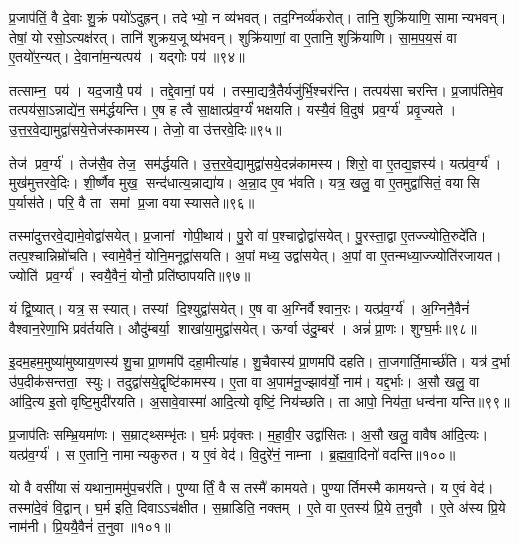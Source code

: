प्र॒जाप॑तिं॒ वै दे॒वाः  शु॒क्रं पयो॑ऽदुह्रन्। तदेभ्यो॒ न व्य॑भवत्। तद॒ग्निर्व्य॑करोत्। तानि॒ शुक्रि॑याणि॒ सामान्यभवन्। तेषां॒ यो रसो॒ऽत्यक्ष॑रत्। तानि॑ शुक्रय॒जूष्य॑भवन्। शुक्रि॑याणां॒ वा ए॒तानि॒ शुक्रि॑याणि। सा॒म॒प॒य॒सं वा ए॒तयो॑र॒न्यत्। दे॒वाना॑म॒न्यत्पय॑। यद्गोः पय॑॥९४॥

तत्साम्न॒ पय॑। यद॒जायै॒ पय॑। तद्दे॒वानां॒ पय॑। तस्मा॒द्यत्रै॒तैर्यजु॑र्भि॒\-श्चर॑न्ति। तत्पय॑सा चरन्ति। प्र॒जाप॑तिमे॒व तत्पय॑सा॒ऽन्नाद्ये॑न॒ सम॑र्द्धयन्ति। ए॒ष ह त्वै सा॒क्षात्प्र॑व॒र्ग्यं॑ भक्षयति। यस्यै॒वं  वि॒दुष॑ प्रव॒र्ग्य॑ प्रवृ॒ज्यते। उ॒त्त॒र॒वे॒द्यामुद्वा॑स\-ये॒त्तेज॑स्कामस्य। तेजो॒ वा उ॑त्तरवे॒दिः॥९५॥

तेज॑ प्रव॒र्ग्य॑। तेज॑सै॒व तेज॒ सम॑र्द्धयति। उ॒त्त॒र॒वे॒द्यामुद्वा॑सये॒\-दन्न॑\-कामस्य। शिरो॒ वा ए॒तद्य॒ज्ञस्य॑। यत्प्र॑व॒र्ग्य॑। मुख॑मुत्तरवे॒दिः। शी॒र्ष्णैव मुख॒ सन्द॑धात्य॒न्नाद्या॑य। अ॒न्ना॒द ए॒व भ॑वति। यत्र॒ खलु॒ वा ए॒तमुद्वा॑सितं॒ वयासि प॒र्यास॑ते। परि॒ वै ता समां प्र॒जा वयास्यासते॥९६॥

तस्मा॑दुत्तरवे॒द्यामे॒वोद्वा॑सयेत्। प्र॒जानां गोपी॒थाय॑। पु॒रो वा॑ प॒श्चाद्वोद्वा॑सयेत्। पु॒रस्ता॒द्वा ए॒तज्ज्योति॒रुदे॑ति। तत्प॒श्चान्निम्रो॑चति। स्वामे॒वैनं॒ योनि॒मनूद्वा॑सयति। अ॒पां मध्य॒ उद्वा॑सयेत्। अ॒पां वा ए॒तन्मध्या॒ज्ज्योति॑रजायत। ज्योति॑ प्रव॒र्ग्य॑। स्वयै॒वैनं॒ योनौ॒ प्रति॑ष्ठापयति॥९७॥

यं द्वि॒ष्यात्। यत्र॒ स स्यात्। तस्यां दि॒श्युद्वा॑सयेत्। ए॒ष वा अ॒ग्निर्वैश्वान॒रः। यत्प्र॑व॒र्ग्य॑। अ॒ग्निनै॒वैनं॑ वैश्वान॒रेणा॒भि प्रव॑र्तयति। औदु॑म्बर्या॒ शाखा॑या॒मुद्वा॑सयेत्। ऊर्ग्वा उ॑दु॒म्बर॑। अन्नं॑ प्रा॒णः। शुग्घ॒र्मः॥९८॥

इ॒दम॒हम॒मुष्या॑मुष्याय॒णस्य॑ शु॒चा प्रा॒णमपि॑ दहा॒मीत्या॑ह। शु॒चैवास्य॑ प्रा॒णमपि॑ दहति। ता॒जगार्ति॒मार्च्छ॑ति। यत्र॑ द॒र्भा उ॑प॒दीक॑सन्तता॒ स्युः। तदुद्वा॑सये॒द्वृष्टि॑कामस्य। ए॒ता वा अ॒पाम॑नू॒ज्झाव॑र्यो॒ नाम॑। यद्द॒र्भाः। अ॒सौ खलु॒ वा आ॑दि॒त्य इ॒तो वृष्टि॒मुदी॑रयति। अ॒सावे॒वास्मा॑ आदि॒त्यो वृष्टिं॒ निय॑च्छति। ता आपो॒ निय॑ता॒ धन्व॑ना यन्ति॥९९॥

प्र॒जाप॑तिः सम्भ्रि॒यमा॑णः। स॒म्राट्थ्सम्भृ॑तः। घ॒र्मः प्रवृ॑क्तः। म॒हा॒वी॒र उद्वा॑सितः। अ॒सौ खलु॒ वावैष आ॑दि॒त्यः। यत्प्र॑व॒र्ग्य॑। स ए॒तानि॒ नामान्यकुरुत। य ए॒वं वेद॑। वि॒दुरे॑नं॒ नाम्ना। ब्र॒ह्म॒वा॒दिनो॑ वदन्ति॥१००॥

यो वै वसी॑यासं यथाना॒ममु॑प॒चर॑ति। पुण्यार्तिं॒ वै स तस्मै॑ कामयते। पुण्यार्तिमस्मै कामयन्ते। य ए॒वं वेद॑। तस्मा॑दे॒वं  वि॒द्वान्। घ॒र्म इति॒ दिवाऽऽच॑क्षीत। स॒म्राडिति॒ नक्तम्। ए॒ते वा ए॒तस्य॑ प्रि॒ये त॒नुवौ। ए॒ते अ॑स्य प्रि॒ये नाम॑नी। प्रि॒ययै॒वैनं॑ त॒नुवा॥१०१॥

